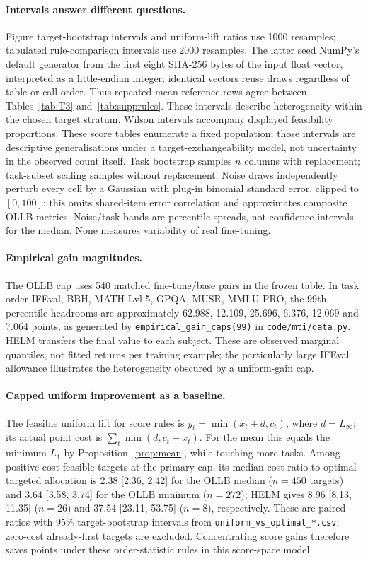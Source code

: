 \documentclass{article}
\begin{document}
\paragraph{Intervals answer different questions.} Figure target-bootstrap intervals and uniform-lift ratios use 1000 resamples; tabulated rule-comparison intervals use 2000 resamples. The latter seed NumPy's default generator from the first eight SHA-256 bytes of the input float vector, interpreted as a little-endian integer; identical vectors reuse draws regardless of table or call order. Thus repeated mean-reference rows agree between Tables~\ref{tab:T3} and~\ref{tab:supprules}. These intervals describe heterogeneity within the chosen target stratum. Wilson intervals accompany displayed feasibility proportions. These score tables enumerate a fixed population; those intervals are descriptive generalisations under a target-exchangeability model, not uncertainty in the observed count itself. Task bootstrap samples $n$ columns with replacement; task-subset scaling samples without replacement. Noise draws independently perturb every cell by a Gaussian with plug-in binomial standard error, clipped to $[0,100]$; this omits shared-item error correlation and approximates composite OLLB metrics. Noise/task bands are percentile spreads, not confidence intervals for the median. None measures variability of real fine-tuning.

\paragraph{Empirical gain magnitudes.} The OLLB cap uses 540 matched fine-tune/base pairs in the frozen table. In task order IFEval, BBH, MATH Lvl 5, GPQA, MUSR, MMLU-PRO, the 99th-percentile headrooms are approximately 62.988, 12.109, 25.696, 6.376, 12.069 and 7.064 points, as generated by \texttt{empirical\_gain\_caps(99)} in \texttt{code/mti/data.py}. HELM transfers the final value to each subject. These are observed marginal quantiles, not fitted returns per training example; the particularly large IFEval allowance illustrates the heterogeneity obscured by a uniform-gain cap.

\paragraph{Capped uniform improvement as a baseline.} The feasible uniform lift for score rules is $y_t=\min(x_t+d,c_t)$, where $d=L_\infty$; its actual point cost is $\sum_t\min(d,c_t-x_t)$. For the mean this equals the minimum $L_1$ by Proposition~\ref{prop:mean}, while touching more tasks. Among positive-cost feasible targets at the primary cap, its median cost ratio to optimal targeted allocation is 2.38 [2.36, 2.42] for the OLLB median ($n=450$ targets) and 3.64 [3.58, 3.74] for the OLLB minimum ($n=272$); HELM gives 8.96 [8.13, 11.35] ($n=26$) and 37.54 [23.11, 53.75] ($n=8$), respectively. These are paired ratios with 95\% target-bootstrap intervals from \texttt{uniform\_vs\_optimal\_*.csv}; zero-cost already-first targets are excluded. Concentrating score gains therefore saves points under these order-statistic rules in this score-space model.
\end{document}
